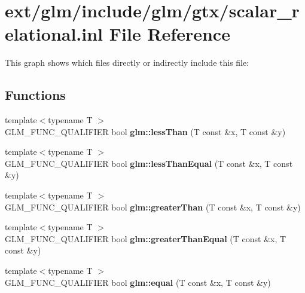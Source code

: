 \hypertarget{scalar__relational_8inl}{\section{ext/glm/include/glm/gtx/scalar\-\_\-relational.inl File Reference}
\label{scalar__relational_8inl}
}
This graph shows which files directly or indirectly include this file\-:
\subsection*{Functions}
\begin{DoxyCompactItemize}
\item 
\hypertarget{namespaceglm_a6f2a3cef357dbf21b5fc90aded289ba1}{{\footnotesize template$<$typename T $>$ }\\G\-L\-M\-\_\-\-F\-U\-N\-C\-\_\-\-Q\-U\-A\-L\-I\-F\-I\-E\-R bool {\bfseries glm\-::less\-Than} (T const \&x, T const \&y)}\label{namespaceglm_a6f2a3cef357dbf21b5fc90aded289ba1}

\item 
\hypertarget{namespaceglm_a299eb11fb67637d37144dc0fcc6c6ff3}{{\footnotesize template$<$typename T $>$ }\\G\-L\-M\-\_\-\-F\-U\-N\-C\-\_\-\-Q\-U\-A\-L\-I\-F\-I\-E\-R bool {\bfseries glm\-::less\-Than\-Equal} (T const \&x, T const \&y)}\label{namespaceglm_a299eb11fb67637d37144dc0fcc6c6ff3}

\item 
\hypertarget{namespaceglm_ae567b870c79fb61cf069d489133eaf48}{{\footnotesize template$<$typename T $>$ }\\G\-L\-M\-\_\-\-F\-U\-N\-C\-\_\-\-Q\-U\-A\-L\-I\-F\-I\-E\-R bool {\bfseries glm\-::greater\-Than} (T const \&x, T const \&y)}\label{namespaceglm_ae567b870c79fb61cf069d489133eaf48}

\item 
\hypertarget{namespaceglm_a03e93d49cec76267c3e11fd68381639a}{{\footnotesize template$<$typename T $>$ }\\G\-L\-M\-\_\-\-F\-U\-N\-C\-\_\-\-Q\-U\-A\-L\-I\-F\-I\-E\-R bool {\bfseries glm\-::greater\-Than\-Equal} (T const \&x, T const \&y)}\label{namespaceglm_a03e93d49cec76267c3e11fd68381639a}

\item 
\hypertarget{namespaceglm_a9943cfbeef0a00a2becb541e9e3818ed}{{\footnotesize template$<$typename T $>$ }\\G\-L\-M\-\_\-\-F\-U\-N\-C\-\_\-\-Q\-U\-A\-L\-I\-F\-I\-E\-R bool {\bfseries glm\-::equal} (T const \&x, T const \&y)}\label{namespaceglm_a9943cfbeef0a00a2becb541e9e3818ed}


\end{DoxyCompactItemize}
